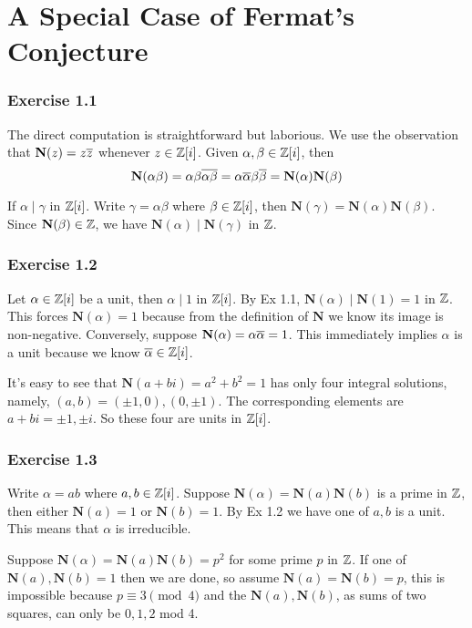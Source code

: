 \documentclass[../Marcus.tex]{subfiles}
\begin{document}
\chapter{A Special Case of Fermat's Conjecture}

\subsection*{Exercise 1.1}

The direct computation is straightforward but laborious. We use the observation that $\mathbf{N}(z)=z\overline{z}$ whenever $z\in\mathbb{Z}[i]$. Given $\alpha,\beta\in\mathbb{Z}[i]$, then $$\mathbf{N}(\alpha\beta)=\alpha\beta\overline{\alpha\beta}=\alpha\overline{\alpha}\beta\overline{\beta}=\mathbf{N}(\alpha)\mathbf{N}(\beta)$$

If $\alpha\mid\gamma$ in $\mathbb{Z}[i]$. Write $\gamma=\alpha\beta$ where $\beta\in\mathbb{Z}[i]$, then $\mathbf{N}(\gamma)=\mathbf{N}(\alpha)\mathbf{N}(\beta)$. Since $\mathbf{N}(\beta)\in\mathbb{Z}$, we have $\mathbf{N}(\alpha)\mid\mathbf{N}(\gamma)$ in $\mathbb{Z}$.

\subsection*{Exercise 1.2}

Let $\alpha\in\mathbb{Z}[i]$ be a unit, then $\alpha\mid 1$ in $\mathbb{Z}[i]$. By Ex 1.1, $\mathbf{N}(\alpha)\mid \mathbf{N}(1)=1$ in $\mathbb{Z}$. This forces $\mathbf{N}(\alpha)=1$ because from the definition of $\mathbf{N}$ we know its image is non-negative. Conversely, suppose $\mathbf{N}(\alpha)=\alpha\overline{\alpha}=1$. This immediately implies $\alpha$ is a unit because we know $\overline{\alpha}\in\mathbb{Z}[i]$.

It's easy to see that $\mathbf{N}(a+bi)=a^2+b^2=1$ has only four integral solutions, namely, $(a,b)=(\pm1,0),(0,\pm1)$. The corresponding elements are $a+bi=\pm1,\pm i$. So these four are units in $\mathbb{Z}[i]$.

\subsection*{Exercise 1.3}

Write $\alpha=ab$ where $a,b\in\mathbb{Z}[i]$. Suppose $\mathbf{N}(\alpha)=\mathbf{N}(a)\mathbf{N}(b)$ is a prime in $\mathbb{Z}$, then either $\mathbf{N}(a)=1$ or $\mathbf{N}(b)=1$. By Ex 1.2 we have one of $a,b$ is a unit. This means that $\alpha$ is irreducible.

Suppose $\mathbf{N}(\alpha)=\mathbf{N}(a)\mathbf{N}(b)=p^2$ for some prime $p$ in $\mathbb{Z}$. If one of $\mathbf{N}(a),\mathbf{N}(b)=1$ then we are done, so assume $\mathbf{N}(a)=\mathbf{N}(b)=p$, this is impossible because $p\equiv 3\pmod{4}$ and the $\mathbf{N}(a),\mathbf{N}(b)$, as sums of two squares, can only be $0,1,2$ mod 4.
\end{document}
